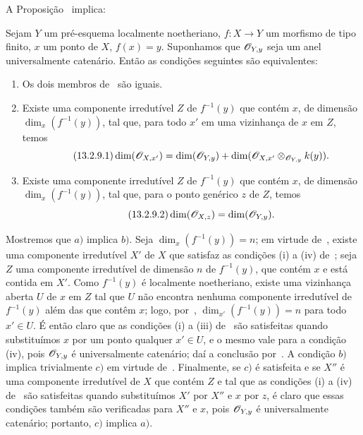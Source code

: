 A Proposição~ implica:

\begin{corollary}[13.2.9]
\label{IV.13.2.9}
Sejam $Y$ um pré-esquema localmente noetheriano, $f:X\to Y$ um morfismo de
tipo finito, $x$ um ponto de $X$, $f(x)=y$.
Suponhamos que $\mathscr{O}_{Y,y}$ seja um anel universalmente catenário.
Então as condições seguintes são equivalentes:
\begin{enumerate}[label=\emph{\alph*)}]
  \item Os dois membros de~ são iguais.
  \item Existe uma componente irredutível $Z$ de $f^{-1}(y)$ que contém $x$,
  de dimensão $\dim_x(f^{-1}(y))$, tal que, para todo $x'$ em uma vizinhança
  de $x$ em $Z$, temos
  \[
  \label{IV.13.2.9.1}
\tag{13.2.9.1}
    \dim(\sh{O}_{X,x'})=\dim(\sh{O}_{Y,y})+\dim(\sh{O}_{X,x'}\otimes_{\sh{O}_{Y,y}}k(y)).
  \]
  \item Existe uma componente irredutível $Z$ de $f^{-1}(y)$ que contém $x$,
  de dimensão $\dim_x(f^{-1}(y))$, tal que, para o ponto genérico $z$ de $Z$,
  temos
  \[
  \label{IV.13.2.9.2}
\tag{13.2.9.2}
    \dim(\sh{O}_{X,z})=\dim(\sh{O}_{Y,y}).
  \]
\end{enumerate}
\end{corollary}

Mostremos que $a)$ implica $b)$.
Seja $\dim_x(f^{-1}(y))=n$; em virtude de~, existe uma
componente irredutível $X'$ de $X$ que satisfaz as condições (i) a (iv)
de~; seja $Z$ uma componente irredutível de dimensão $n$ de
$f^{-1}(y)$, que contém $x$ e está contida em $X'$.
Como $f^{-1}(y)$ é localmente noetheriano, existe uma vizinhança aberta $U$
de $x$ em $Z$ tal que $U$ não encontra nenhuma componente irredutível de
$f^{-1}(y)$ além das que contêm $x$; logo, por~,
$\dim_{x'}(f^{-1}(y))=n$ para todo $x'\in U$.
É então claro que as condições (i) a (iii) de~ são
satisfeitas quando substituímos $x$ por um ponto qualquer $x'\in U$, e o
mesmo vale para a condição (iv), pois $\mathscr{O}_{Y,y}$ é universalmente
catenário; daí a conclusão por~.
A condição $b)$ implica trivialmente $c)$ em virtude de~.
Finalmente, se $c)$ é satisfeita e se $X''$ é uma componente irredutível de
$X$ que contém $Z$ e tal que as condições (i) a (iv) de~
são satisfeitas quando substituímos $X'$ por $X''$ e $x$ por $z$, é claro
que essas condições também são verificadas para $X''$ e $x$, pois
$\mathscr{O}_{Y,y}$ é universalmente catenário; portanto, $c)$ implica $a)$.

